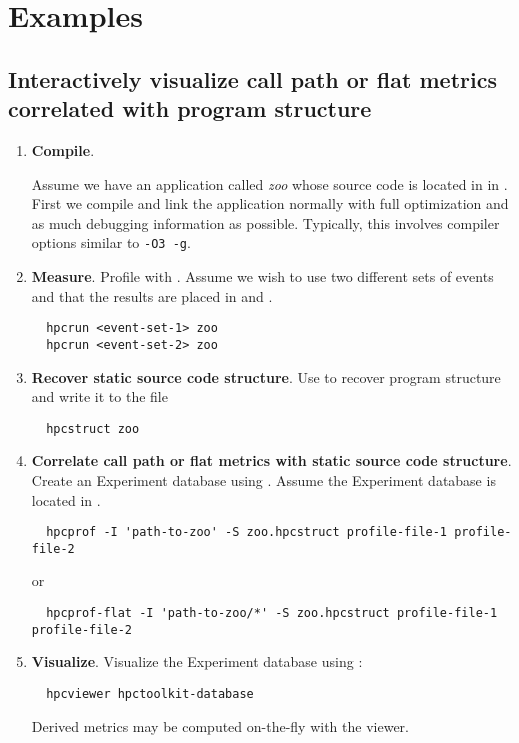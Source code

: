 \documentclass[english]{article}
\begin{document}
\section{Examples}

\subsection{Interactively visualize call path or flat metrics correlated with program structure}



\begin{enumerate}

\item \textbf{Compile}.  

Assume we have an application called \emph{zoo} whose source code is located in in .
First we compile and link the application normally with full optimization and as much debugging information as possible.
Typically, this involves compiler options similar to \verb+-O3 -g+.

\item \textbf{Measure}.
Profile with .  Assume we wish to use two different sets of events and that the results are placed in  and .
\begin{verbatim}
  hpcrun <event-set-1> zoo
  hpcrun <event-set-2> zoo
\end{verbatim}

\item \textbf{Recover static source code structure}. 
Use  to recover program structure and write it to the file 
\begin{verbatim}
  hpcstruct zoo
\end{verbatim}

\item \textbf{Correlate call path or flat metrics with static source code structure}.
Create an Experiment database using .  Assume the Experiment database is located in .
\begin{verbatim}
  hpcprof -I 'path-to-zoo' -S zoo.hpcstruct profile-file-1 profile-file-2
\end{verbatim}
or
\begin{verbatim}
  hpcprof-flat -I 'path-to-zoo/*' -S zoo.hpcstruct profile-file-1 profile-file-2
\end{verbatim}

\item \textbf{Visualize}.
Visualize the Experiment database using :
\begin{verbatim}
  hpcviewer hpctoolkit-database
\end{verbatim}
Derived metrics may be computed on-the-fly with the viewer.

\end{enumerate}
\end{document}
